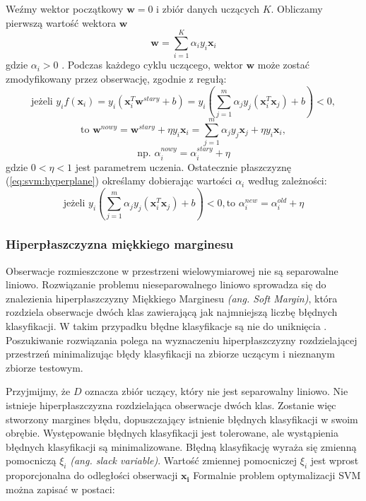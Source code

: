 \documentclass[a4paper,12pt,twoside,openany]{report}
\newcommand{\ang}[1]{\textit{(ang. #1)}}
\newcommand{\Eq}[1]{(\ref{#1})}
\renewcommand{\vec}[1]{\bm{#1}}
\begin{document}
Weźmy wektor początkowy $\vec{w} = 0$ i zbiór danych uczących $K$.
Obliczamy pierwszą wartość wektora $\vec{w}$
\begin{equation}\label{eq:svm:hyperplane}
	{\vec{w}}=\sum_{i=1}^K \alpha_i y_i {\vec{x}}_i
\end{equation}
gdzie $\alpha_i>0$ \cite{Mittal2016}.
Podczas każdego cyklu uczącego, wektor $\vec{w}$ może zostać zmodyfikowany przez obserwację, 
zgodnie z regułą:
\begin{equation}
	\mbox{jeżeli } y_i f({\vec{x}}_i)=y_i ({\vec{x}}_i^T{\vec{w}}^{stary}+b)
	=y_i\left(\sum_{j=1}^m \alpha_j y_j({\vec{x}}_i^T{\vec{x}}_j)+b\right)<0,
\end{equation}
\begin{equation}
	\mbox{to } {\vec{w}}^{nowy}={\vec{w}}^{stary}+\eta y_i {\vec{x}}_i
	=\sum_{j=1}^{m} \alpha_j y_j\vec{x}_j +\eta y_i {\vec{x}}_i,
\end{equation}
\begin{equation}
	\mbox{np. }
	\alpha_i^{nowy}=\alpha_i^{stary}+\eta
\end{equation}
gdzie $0 < \eta < 1$ jest parametrem uczenia.
Ostatecznie płaszczyznę \Eq{eq:svm:hyperplane} określamy dobierając wartości $\alpha_i$ według zależności: 
\begin{equation}
	\mbox{jeżeli } y_i\left(\sum_{j=1}^m \alpha_j y_j({\vec{x}}_i^T\vec{x}_j)+b\right)<0,
	\mbox{to } \alpha_i^{new}=\alpha_i^{old}+\eta 
\end{equation}

\subsubsection{Hiperpłaszczyzna miękkiego marginesu}
Obserwacje rozmieszczone w przestrzeni wielowymiarowej nie są separowalne liniowo. 
Rozwiązanie problemu nieseparowalnego liniowo sprowadza się do znalezienia hiperpłaszczyzny Miękkiego Marginesu \ang{Soft Margin}, 
która rozdziela obserwacje dwóch klas zawierającą jak najmniejszą liczbę błędnych klasyfikacji.
W takim przypadku błędne klasyfikacje są nie do uniknięcia \cite{Dellepiane2015}.
Poszukiwanie rozwiązania polega na wyznaczeniu hiperpłaszczyzny rozdzielającej przestrzeń 
minimalizując błędy klasyfikacji na zbiorze uczącym i nieznanym zbiorze testowym.

Przyjmijmy, że $D$ oznacza zbiór uczący, który nie jest separowalny liniowo. 
Nie istnieje hiperpłaszczyzna rozdzielająca obserwacje dwóch klas.
Zostanie więc stworzony margines błędu, dopuszczający istnienie błędnych klasyfikacji w swoim obrębie.
Występowanie błędnych klasyfikacji jest tolerowane, ale wystąpienia błędnych klasyfikacji są minimalizowane.
Błędną klasyfikację wyraża się zmienną pomocniczą $\xi_i$ \ang{slack variable}. 
Wartość zmiennej pomocniczej $\xi_i$ jest wprost proporcjonalna do odległości obserwacji $\vec{x_i}$
Formalnie problem optymalizacji SVM można zapisać w postaci:
\end{document}
